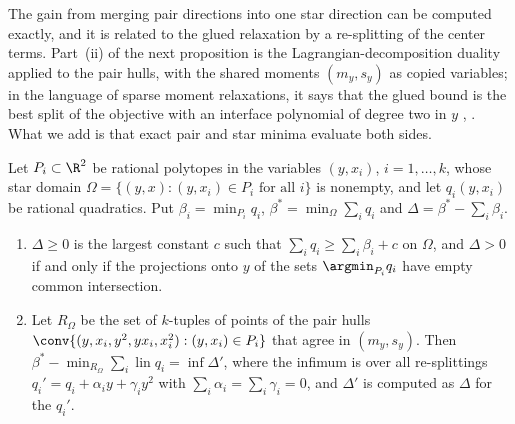 The gain from merging pair directions into one star direction can be
computed exactly, and it is related to the glued relaxation by a
re-splitting of the center terms. Part~(ii) of the next proposition is the
Lagrangian-decomposition duality \citep{Geoffrion1974,GuignardKim1987} applied
to the pair hulls, with the shared moments $(m_y,s_y)$ as copied variables; in the
language of sparse moment relaxations, it says that the glued bound is the best
split of the objective with an interface polynomial of degree two in $y$
\citep{GrimmNetzerSchweighofer2007}, \citep[Theorem~3.1]{NieQuTangZhang2026}.
What we add is that exact pair and star minima evaluate both sides.

\begin{proposition}\label{prop:gain}
Let $P_i\subset\R^2$ be rational polytopes in the variables $(y,x_i)$,
$i=1,\dots,k$, whose star domain $\Omega=\{(y,x):(y,x_i)\in P_i\text{ for all }i\}$
is nonempty, and let $q_i(y,x_i)$ be rational quadratics. Put
$\beta_i=\min_{P_i}q_i$, $\beta^\ast=\min_\Omega\sum_iq_i$ and
$\Delta=\beta^\ast-\sum_i\beta_i$.
\begin{enumerate}[label=(\roman*)]
\item $\Delta\ge0$ is the largest constant $c$ such that
$\sum_iq_i\ge\sum_i\beta_i+c$ on $\Omega$, and $\Delta>0$ if and only if the
projections onto $y$ of the sets $\argmin_{P_i}q_i$ have empty common
intersection.
\item Let $R_\Omega$ be the set of $k$-tuples of points of the pair hulls
$\conv\{(y,x_i,y^2,yx_i,x_i^2):(y,x_i)\in P_i\}$ that agree in $(m_y,s_y)$.
Then $\beta^\ast-\min_{R_\Omega}\sum_i\operatorname{lin}q_i=\inf\Delta'$, where
the infimum is over all re-splittings $q_i'=q_i+\alpha_iy+\gamma_iy^2$ with
$\sum_i\alpha_i=\sum_i\gamma_i=0$, and $\Delta'$ is computed as $\Delta$ for
the $q_i'$.
\end{enumerate}
\end{proposition}

